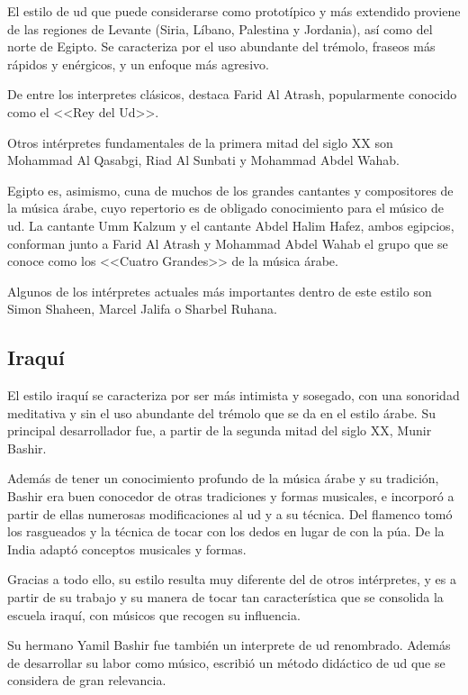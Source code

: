 El estilo de ud que puede considerarse como prototípico y más extendido proviene de las regiones de Levante (Siria, Líbano, Palestina y Jordania), así como del norte de Egipto. Se caracteriza por el uso abundante del trémolo, fraseos más rápidos y enérgicos, y un enfoque más agresivo.

De entre los interpretes clásicos, destaca Farid Al Atrash, popularmente conocido como el <<Rey del Ud>>.

Otros intérpretes fundamentales de la primera mitad del siglo XX son Mohammad Al Qasabgi, Riad Al Sunbati y Mohammad Abdel Wahab.

Egipto es, asimismo, cuna de muchos de los grandes cantantes y compositores de la música árabe, cuyo repertorio es de obligado conocimiento para el músico de ud. La cantante Umm Kalzum y el cantante Abdel Halim Hafez, ambos egipcios, conforman junto a Farid Al Atrash y Mohammad Abdel Wahab el grupo que se conoce como los <<Cuatro Grandes>> de la música árabe.

Algunos de los intérpretes actuales más importantes dentro de este estilo son Simon Shaheen, Marcel Jalifa o Sharbel Ruhana.


\subsection{Iraquí}

El estilo iraquí se caracteriza por ser más intimista y sosegado, con una sonoridad meditativa y sin el uso abundante del trémolo que se da en el estilo árabe. Su principal desarrollador fue, a partir de la segunda mitad del siglo XX, Munir Bashir.

Además de tener un conocimiento profundo de la música árabe y su tradición, Bashir era buen conocedor de otras tradiciones y formas musicales, e incorporó a partir de ellas numerosas modificaciones al ud y a su técnica. Del flamenco tomó los rasgueados y la técnica de tocar con los dedos en lugar de con la púa. De la India adaptó conceptos musicales y formas.

Gracias a todo ello, su estilo resulta muy diferente del de otros intérpretes, y es a partir de su trabajo y su manera de tocar tan característica que se consolida la escuela iraquí, con músicos que recogen su influencia.

Su hermano Yamil Bashir fue también un interprete de ud renombrado. Además de desarrollar su labor como músico, escribió un método didáctico de ud que se considera de gran relevancia.

